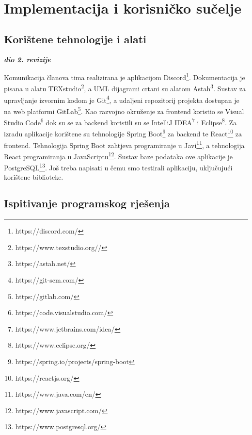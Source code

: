 \chapter{Implementacija i korisničko sučelje}
		
		
		\section{Korištene tehnologije i alati}
		
			\textbf{\textit{dio 2. revizije}}
	
			Komunikacija članova tima realizirana je aplikacijom Discord\footnote{https://discord.com/}. Dokumentacija je pisana u alatu TEXstudio\footnote{https://www.texstudio.org//}, a UML dijagrami crtani su alatom Astah\footnote{https://astah.net/}. Sustav za upravljanje izvornim kodom je Git\footnote{https://git-scm.com/}, a udaljeni repozitorij projekta dostupan je na web platformi GitLab\footnote{https://gitlab.com/}. Kao razvojno okruženje za frontend koristio se Visual Studio Code\footnote{https://code.visualstudio.com/} dok su se  za backend koristili su se IntelliJ IDEA\footnote{https://www.jetbrains.com/idea/} i Eclipse\footnote{https://www.eclipse.org/}. Za izradu aplikacije korištene su tehnologije Spring Boot\footnote{https://spring.io/projects/spring-boot} za backend te React\footnote{https://reactjs.org/} za frontend. Tehnologija Spring Boot zahtjeva programiranje u Javi\footnote{https://www.java.com/en/}, a tehnologija React programiranja u JavaScriptu\footnote{https://www.javascript.com/}. Sustav baze podataka ove aplikacije je PostgreSQL\footnote{https://www.postgresql.org/}. Još treba napisati u čemu smo testirali aplikaciju, uključujući korištene biblioteke.
			
			
			\eject 
		
	
		\section{Ispitivanje programskog rješenja}
			

			

